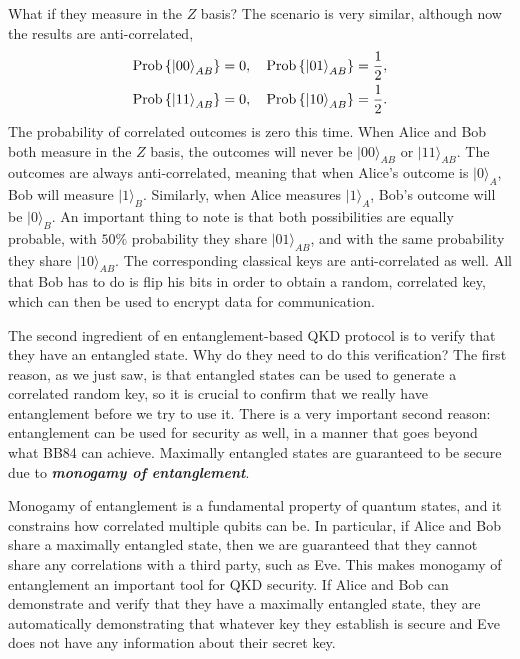 What if they measure in the $Z$ basis? The scenario is very similar, although now the results are anti-correlated,
\begin{align}
\begin{aligned}
    \operatorname{Prob}\left\{\left| 00 \right\rangle_{A B}\right\} & = 0, \quad \operatorname{Prob}\left\{\left| 01 \right\rangle_{A B}\right\} = \frac{1}{2}, \\ 
    \operatorname{Prob}\left\{\left| 11 \right\rangle_{A B}\right\} & = 0, \quad \operatorname{Prob}\left\{\left| 10 \right\rangle_{A B}\right\} = \frac{1}{2}.
\end{aligned}
\end{align}
The probability of correlated outcomes is zero this time.
When Alice and Bob both measure in the $Z$ basis, the outcomes will never be $|00\rangle_{AB}$ or $|11\rangle_{AB}$.
The outcomes are always anti-correlated, meaning that when Alice's outcome is $|0\rangle_A$, Bob will measure $|1\rangle_B$.
Similarly, when Alice measures $|1\rangle_A$, Bob's outcome will be $|0\rangle_B$.
An important thing to note is that both possibilities are equally probable, with $50\%$ probability they share $|01\rangle_{AB}$, and with the same probability they share $|10\rangle_{AB}$.
The corresponding classical keys are anti-correlated as well.
All that Bob has to do is flip his bits in order to obtain a random, correlated key, which can then be used to encrypt data for communication.

The second ingredient of en entanglement-based QKD protocol is to verify that they have an entangled state.
Why do they need to do this verification?
The first reason, as we just saw, is that entangled states can be used to generate a correlated random key, so it is crucial to confirm that we really have entanglement before we try to use it.
There is a very important second reason: entanglement can be used for security as well, in a manner that goes beyond what BB84 can achieve. Maximally entangled states are guaranteed to be secure due to \textbf{\emph{monogamy of entanglement}}.

Monogamy of entanglement is a fundamental property of quantum states,
and it constrains how correlated multiple qubits can be.
In particular, if Alice and Bob share a maximally entangled state,
then we are guaranteed that they cannot share any correlations with a third party, such as Eve.
This makes monogamy of entanglement an important tool for QKD security.
If Alice and Bob can demonstrate and verify that they have a maximally entangled state, they are automatically demonstrating that whatever
key they establish is secure and Eve does not have any information about their secret key.

